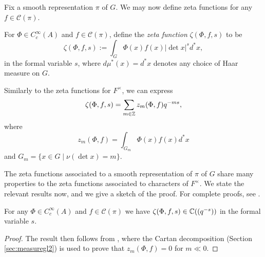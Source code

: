 Fix a smooth representation $\pi$ of $G$. We may now define zeta functions for any $f \in \mathcal C(\pi)$.

\begin{defn}
    For $\Phi \in C_c^\infty(A)$ and $f \in \mathcal C(\pi)$, define the \textit{zeta function} $\zeta(\Phi,f,s)$ to be
    $$\zeta(\Phi,f,s) := \int_{G} \Phi(x)f(x)|\det x|^s d^*x,$$ in the formal variable $s$, where $d\mu^*(x) = d^*x$ denotes any choice of Haar measure on $G$.
\end{defn}

Similarly to the zeta functions for $F^\times$, we can express 
$$\zeta(\Phi,f,s)=\sum_{m\in\mathbb{Z}}z_m(\Phi,f)q^{-ms},$$
where 
$$z_m(\Phi,f)=\int_{G_m}\Phi(x)f(x)d^*x$$
and $G_m=\{x\in G\mid\nu(\det x)=m\}$. 

The zeta functions associated to a smooth representation of $\pi$ of $G$ share many properties to the zeta functions associated to characters of $F^\times$. We state the relevant results now, and we give a sketch of the proof. For complete proofs, see \cite[\S 24.4]{BH1}.

\begin{lemma}
    For any $\Phi \in C_c^\infty(A)$ and $f \in \mathcal C(\pi)$ we have $\zeta(\Phi,f,s) \in \mathbb{C}((q^{-s}))$ in the formal variable $s$.
\end{lemma}
\begin{proof}
    The result then follows from \cite[Lemma 24.4.1]{BH1}, where the Cartan decomposition (Section \ref{sec:measuregl2}) is used to prove that $z_m(\Phi,f)=0$ for $m\ll0$.
\end{proof}

